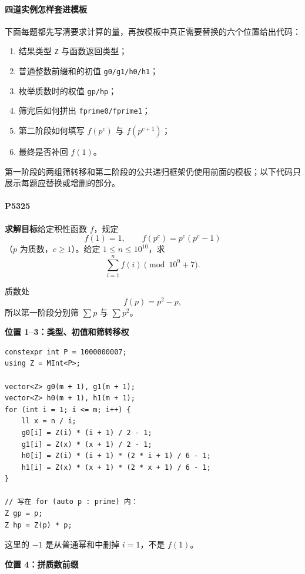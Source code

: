 \paragraph*{四道实例怎样套进模板}

下面每题都先写清要求计算的量，再按模板中真正需要替换的六个位置给出代码：

\begin{enumerate}
    \item 结果类型 \texttt{Z} 与函数返回类型；
    \item 普通整数前缀和的初值 \texttt{g0/g1/h0/h1}；
    \item 枚举质数时的权值 \texttt{gp/hp}；
    \item 筛完后如何拼出 \texttt{fprime0/fprime1}；
    \item 第二阶段如何填写 \(f(p^c)\) 与 \(f(p^{c+1})\)；
    \item 最终是否补回 \(f(1)\)。
\end{enumerate}

第一阶段的两组筛转移和第二阶段的公共递归框架仍使用前面的模板；以下代码只
展示每题应替换或增删的部分。

\paragraph*{P5325}

\textbf{求解目标}\quad 给定积性函数 \(f\)，规定
\[
f(1)=1,\qquad f(p^c)=p^c(p^c-1)
\]
（\(p\) 为质数，\(c\ge1\)）。给定 \(1\le n\le10^{10}\)，求
\[
\sum_{i=1}^{n}f(i)\pmod {10^9+7}.
\]

质数处
\[
f(p)=p^2-p,
\]
所以第一阶段分别筛 \(\sum p\) 与 \(\sum p^2\)。

\textbf{位置 1--3：类型、初值和筛转移权}

\begin{verbatim}
constexpr int P = 1000000007;
using Z = MInt<P>;

vector<Z> g0(m + 1), g1(m + 1);
vector<Z> h0(m + 1), h1(m + 1);
for (int i = 1; i <= m; i++) {
    ll x = n / i;
    g0[i] = Z(i) * (i + 1) / 2 - 1;
    g1[i] = Z(x) * (x + 1) / 2 - 1;
    h0[i] = Z(i) * (i + 1) * (2 * i + 1) / 6 - 1;
    h1[i] = Z(x) * (x + 1) * (2 * x + 1) / 6 - 1;
}

// 写在 for (auto p : prime) 内：
Z gp = p;
Z hp = Z(p) * p;
\end{verbatim}

这里的 \(-1\) 是从普通幂和中删掉 \(i=1\)，不是 \(f(1)\)。

\textbf{位置 4：拼质数前缀}

